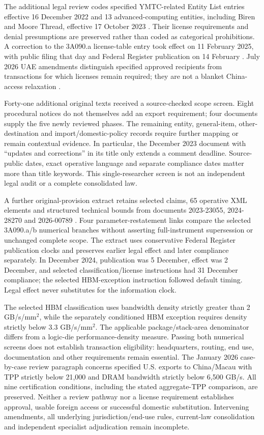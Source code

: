 \documentclass[11pt]{article}
\begin{document}
The additional legal review codes specified YMTC-related Entity List entries effective 16 December 2022 and 13 advanced-computing entities, including Biren and Moore Thread, effective 17 October 2023 \citep{BIS2022Entity,BIS2023Entity}. Their license requirements and denial presumptions are preserved rather than coded as categorical prohibitions. A correction to the 3A090.a license-table entry took effect on 11 February 2025, with public filing that day and Federal Register publication on 14 February \citep{BIS2025Correction}. July 2026 UAE amendments distinguish specified approved recipients from transactions for which licenses remain required; they are not a blanket China-access relaxation \citep{BIS2026UAE}.

Forty-one additional original texts received a source-checked scope screen. Eight procedural notices do not themselves add an export requirement; four documents supply the five newly reviewed phases. The remaining entity, general-item, other-destination and import/domestic-policy records require further mapping or remain contextual evidence. In particular, the December 2023 document with ``updates and corrections'' in its title only extends a comment deadline. Source-public dates, exact operative language and separate compliance dates matter more than title keywords. This single-researcher screen is not an independent legal audit or a complete consolidated law.

A further original-provision extract retains \LegalProvisions{} selected claims, 65 operative XML elements and \LegalBounds{} structured technical bounds from documents 2023-23055, 2024-28270 and 2026-00789 \citep{BIS2023Compute,BIS2024HBM,BIS2026}. Four parameter-restatement links compare the selected 3A090.a/b numerical branches without asserting full-instrument supersession or unchanged complete scope. The extract uses conservative Federal Register publication clocks and preserves earlier legal effect and later compliance separately. In December 2024, publication was 5 December, effect was 2 December, and selected classification/license instructions had 31 December compliance; the selected HBM-exception instruction followed default timing. Legal effect never substitutes for the information clock.

The selected HBM classification uses bandwidth density strictly greater than 2 GB/s/mm$^2$, while the separately conditioned HBM exception requires density strictly below 3.3 GB/s/mm$^2$. The applicable package/stack-area denominator differs from a logic-die performance-density measure. Passing both numerical screens does not establish transaction eligibility: headquarters, routing, end use, documentation and other requirements remain essential. The January 2026 case-by-case review paragraph concerns specified U.S. exports to China/Macau with TPP strictly below 21,000 and DRAM bandwidth strictly below 6,500 GB/s. All nine certification conditions, including the stated aggregate-TPP comparison, are preserved. Neither a review pathway nor a license requirement establishes approval, usable foreign access or successful domestic substitution. Intervening amendments, all underlying jurisdiction/end-use rules, current-law consolidation and independent specialist adjudication remain incomplete.
\end{document}
